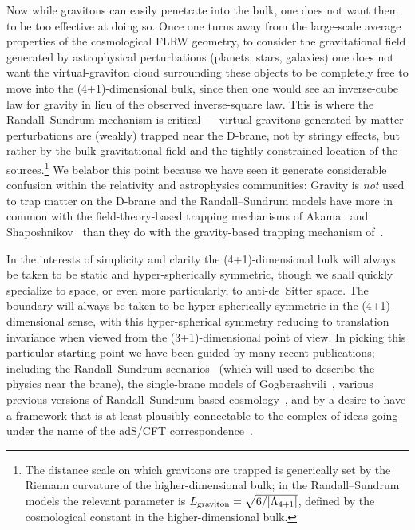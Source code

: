 \documentclass[a4paper,12pt]{article}
\begin{document}
Now while gravitons can easily penetrate into the bulk, one does not
want them to be too effective at doing so. Once one turns away from
the large-scale average properties of the cosmological FLRW geometry,
to consider the gravitational field generated by astrophysical
perturbations (planets, stars, galaxies) one does not want the
virtual-graviton cloud surrounding these objects to be completely free
to move into the (4+1)-dimensional bulk, since then one would see an
inverse-cube law for gravity in lieu of the observed inverse-square
law. This is where the Randall--Sundrum mechanism is critical ---
virtual gravitons generated by matter perturbations are (weakly)
trapped near the D-brane, not by stringy effects, but rather by the
bulk gravitational field and the tightly constrained location of the
sources.\footnote{
The distance scale on which gravitons are trapped is generically set
by the Riemann curvature of the higher-dimensional bulk; in the
Randall--Sundrum models the relevant parameter is $L_{\mathrm{graviton}} =
\sqrt{6/|\Lambda_{4+1}|}$, defined by the cosmological constant in the
higher-dimensional bulk.}
We belabor this point because we have seen it generate considerable
confusion within the relativity and astrophysics communities: Gravity
is {\em not\/} used to trap matter on the D-brane and the
Randall--Sundrum models have more in common with the
field-theory-based trapping mechanisms of Akama~\cite{Akama} and
Shaposhnikov~\cite{Shaposhnikov} than they do with the gravity-based
trapping mechanism of~\cite{Exotic}.

In the interests of simplicity and clarity the (4+1)-dimensional bulk
will always be taken to be static and hyper-spherically symmetric,
though we shall quickly specialize to {\RNdS} space, or even more
particularly, to anti-de~Sitter space. The boundary will always be
taken to be hyper-spherically symmetric in the (4+1)-dimensional
sense, with this hyper-spherical symmetry reducing to translation
invariance when viewed from the (3+1)-dimensional point of view. In
picking this particular starting point we have been guided by many
recent publications; including the Randall--Sundrum
scenarios~\cite{RS1,RS2} (which will used to describe the physics near
the brane), the single-brane models of
Gogberashvili~\cite{Gogberashvili1,Gogberashvili2}, various previous
versions of Randall--Sundrum based cosmology~\cite{RS-cosmology}, and
by a desire to have a framework that is at least plausibly connectable
to the complex of ideas going under the name of the adS/CFT
correspondence~\cite{adS/CFT,RS-adS/CFT}.
\end{document}
